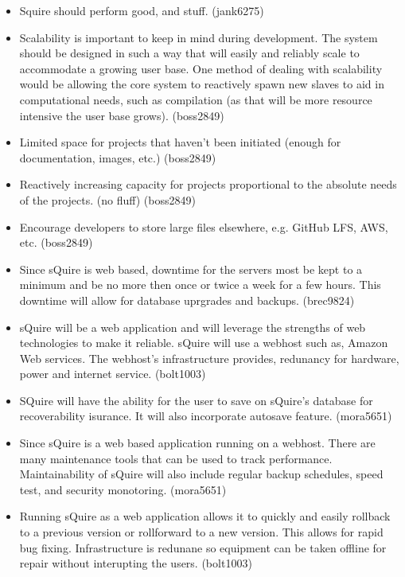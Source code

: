\documentclass[11pt]{report}
\begin{document}
    \begin{itemize}
            \item Squire should perform good, and stuff. (jank6275)
            \item Scalability is important to keep in mind during development. The system should be designed in such a way that will easily and reliably scale to accommodate a growing user base. One method of dealing with scalability would be allowing the core system to reactively spawn new slaves to aid in computational needs, such as compilation (as that will be more resource intensive the user base grows). (boss2849)
            \item Limited space for projects that haven't been initiated (enough for documentation, images, etc.) (boss2849)
            \item Reactively increasing capacity for projects proportional to the absolute needs of the projects. (no fluff) (boss2849)
            \item Encourage developers to store large files elsewhere, e.g. GitHub LFS, AWS, etc. (boss2849)
            \item Since sQuire is web based, downtime for the servers most be kept to a minimum and be no more then once or twice a week for a few hours. This downtime will allow for database uprgrades and backups. (brec9824)
            \item sQuire will be a web application and will leverage the strengths of web technologies to make it reliable.       sQuire will use a webhost such as, Amazon Web services. The webhost's infrastructure provides, redunancy for hardware, power and internet service. (bolt1003)
            \item SQuire will have the ability for the user to save on sQuire's database for recoverability isurance. It will also incorporate autosave feature. (mora5651)
            \item Since sQuire is a web based application running on a webhost. There are 
            many maintenance tools that can be used to track performance. Maintainability of sQuire will also include regular backup schedules, speed test, and security monotoring. (mora5651)
            \item Running sQuire as a web application allows it to quickly and easily rollback to a previous version or rollforward to a new version. This allows for rapid bug fixing. Infrastructure is redunane so equipment can be taken offline for repair without interupting the users. (bolt1003)

\end{itemize}
\end{document}
